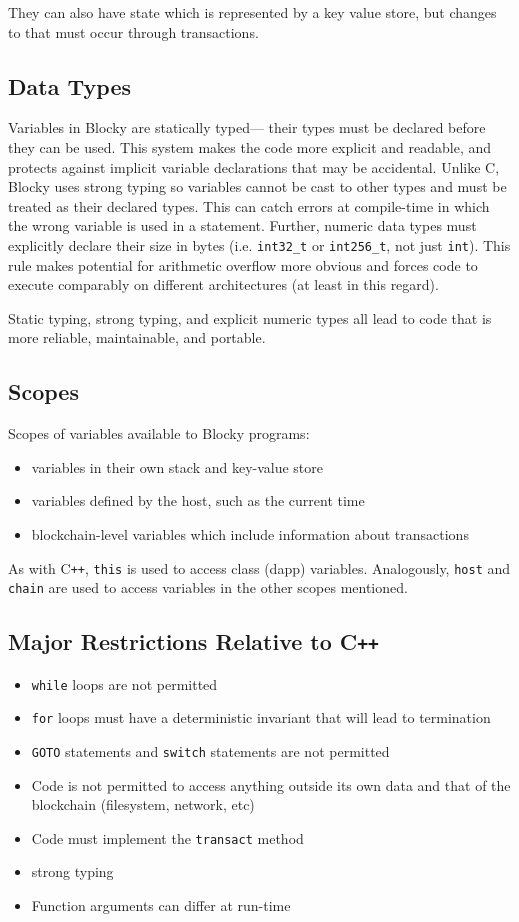 \documentclass[letterpaper]{article}
\begin{document}
They can also have state which is represented by a key value store, but changes to that must occur through transactions.

\subsection{Data Types}
Variables in Blocky are statically typed--- their types must be declared before they can be used. This system makes the code more explicit and readable, and protects against implicit variable declarations that may be accidental. Unlike C, Blocky uses strong typing so variables cannot be cast to other types and must be treated as their declared types. This can catch errors at compile-time in which the wrong variable is used in a statement. Further, numeric data types must explicitly declare their size in bytes (i.e. \texttt{int32\_t} or \texttt{int256\_t}, not just \texttt{int}). This rule makes potential for arithmetic overflow more obvious and forces code to execute comparably on different architectures (at least in this regard).

Static typing, strong typing, and explicit numeric types all lead to code that is more reliable, maintainable, and portable. 

\subsection{Scopes}
Scopes of variables available to Blocky programs:
\begin{itemize}
  \item{variables in their own stack and key-value store}
  \item{variables defined by the host, such as the current time}
  \item{blockchain-level variables which include information about transactions}
\end{itemize}
As with C\texttt{++}, \texttt{this} is used to access class (dapp) variables. Analogously, \texttt{host} and \texttt{chain} are used to access variables in the other scopes mentioned.
\newline

\subsection{Major Restrictions Relative to C\texttt{++}}
\begin{itemize}
  \item{\texttt{while} loops are not permitted}
  \item{\texttt{for} loops must have a deterministic invariant that will lead to termination}
  \item{\texttt{GOTO} statements and \texttt{switch} statements are not permitted}
  \item{Code is not permitted to access anything outside its own data and that of the blockchain (filesystem, network, etc)}
  \item{Code must implement the \texttt{transact} method}
  \item{strong typing}
  \item{Function arguments can differ at run-time}
\end{itemize}
\end{document}
